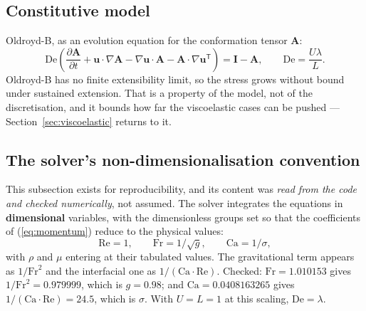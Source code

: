 \subsection{Constitutive model}

Oldroyd-B, as an evolution equation for the conformation tensor $\mathbf{A}$:
\begin{equation}
\mathrm{De}\left(\frac{\partial \mathbf{A}}{\partial t}
  + \mathbf{u}\cdot\nabla\mathbf{A}
  - \nabla\mathbf{u}\cdot\mathbf{A}
  - \mathbf{A}\cdot\nabla\mathbf{u}^{\mathsf{T}}\right)
= \mathbf{I} - \mathbf{A},
\qquad
\mathrm{De} = \frac{U\lambda}{L}.
\label{eq:oldroyd}
\end{equation}
Oldroyd-B has no finite extensibility limit, so the stress grows without bound
under sustained extension. That is a property of the model, not of the
discretisation, and it bounds how far the viscoelastic cases can be pushed ---
Section~\ref{sec:viscoelastic} returns to it.

\subsection{The solver's non-dimensionalisation convention}
\label{sec:convention}

This subsection exists for reproducibility, and its content was \emph{read from
the code and checked numerically}, not assumed. The solver integrates the
equations in \textbf{dimensional} variables, with the dimensionless groups set
so that the coefficients of (\ref{eq:momentum}) reduce to the physical values:
\begin{equation}
\mathrm{Re} = 1,
\qquad
\mathrm{Fr} = 1/\sqrt{g},
\qquad
\mathrm{Ca} = 1/\sigma,
\end{equation}
with $\rho$ and $\mu$ entering at their tabulated values. The gravitational
term appears as $1/\mathrm{Fr}^2$ and the interfacial one as
$1/(\mathrm{Ca}\cdot\mathrm{Re})$. Checked: $\mathrm{Fr} = 1.010153$ gives
$1/\mathrm{Fr}^2 = 0.979999$, which is $g = 0.98$; and
$\mathrm{Ca} = 0.0408163265$ gives $1/(\mathrm{Ca}\cdot\mathrm{Re}) = 24.5$,
which is $\sigma$. With $U = L = 1$ at this scaling, $\mathrm{De} = \lambda$.
